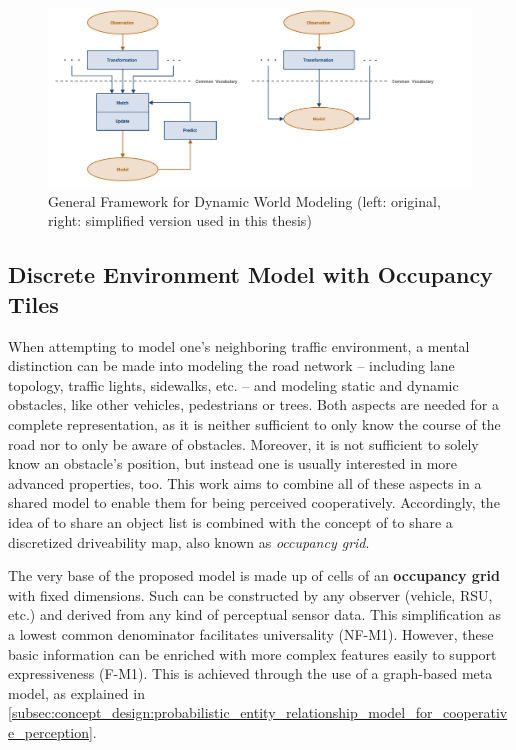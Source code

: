 \begin{figure}
	\centering
	\includegraphics[width=1.0\linewidth]{98_images/dynamic_world_modeling}
	\caption[General Framework for Dynamic World Modeling]{General Framework for Dynamic World Modeling \cite{Crowley1993} (left: original, right: simplified version used in this thesis)}
	\label{fig:dynamic_world_modeling}
\end{figure}

\subsection{Discrete Environment Model with Occupancy Tiles}
\label{subsec:concept_design:discrete_environment_model_with_occupancy_tiles}

When attempting to model one's neighboring traffic environment, a mental distinction can be made into modeling the road network – including lane topology, traffic lights, sidewalks, etc. – and modeling static and dynamic obstacles, like other vehicles, pedestrians or trees. Both aspects are needed for a complete representation, as it is neither sufficient to only know the course of the road nor to only be aware of obstacles. Moreover, it is not sufficient to solely know an obstacle's position, but instead one is usually interested in more advanced properties, too. This work aims to combine all of these aspects in a shared model to enable them for being perceived cooperatively. Accordingly, the idea of \cite{Rauch2011} to share an object list is combined with the concept of \cite{liu2013motion} to share a discretized driveability map, also known as \textit{occupancy grid}. 
\par
\bigskip

The very base of the proposed model is made up of cells of an \textbf{occupancy grid} with fixed dimensions. Such can be constructed by any observer (vehicle, RSU, etc.) and derived from any kind of perceptual sensor data. This simplification as a lowest common denominator facilitates universality (NF-M1). However, these basic information can be enriched with more complex features easily to support expressiveness (F-M1). This is achieved through the use of a graph-based meta model, as explained in \cref{subsec:concept_design:probabilistic_entity_relationship_model_for_cooperative_perception}.

